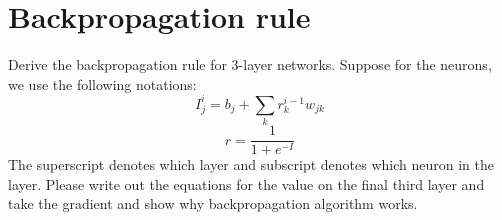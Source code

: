 \documentclass{article}
\begin{document}
{\section*{Backpropagation rule}
Derive the backpropagation rule for 3-layer networks. Suppose for the neurons, we use the following notations:
\begin{equation}
I_j^{i} = b_j + \sum_k r_k^{i-1}w_{jk} 
\end{equation}
\begin{equation}
r = \frac{1}{1+e^{-I}}
\end{equation}
The superscript denotes which layer and subscript denotes which neuron in the layer. Please write out the equations for the value on the final third layer and take the gradient and show why backpropagation  algorithm works.



}
\end{document}
